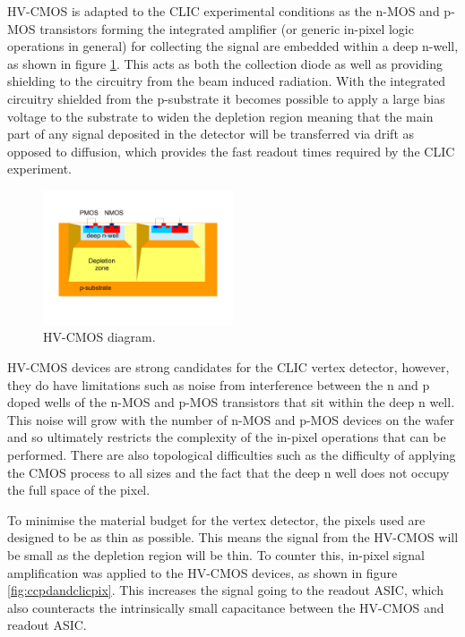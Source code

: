 HV-CMOS is adapted to the CLIC experimental conditions as the n-MOS and p-MOS transistors forming the integrated amplifier (or generic in-pixel logic operations in general) for collecting the signal are embedded within a deep n-well, as shown in figure \ref{fig:hvcmos}.  This acts as both the collection diode as well as providing shielding to the circuitry from the beam induced radiation.  With the integrated circuitry shielded from the p-substrate it becomes possible to apply a large bias voltage to the substrate to widen the depletion region meaning that the main part of any signal deposited in the detector will be transferred via drift as opposed to diffusion, which provides the fast readout times required by the CLIC experiment.  

\begin{figure}
\centering
\includegraphics[width=0.5\textwidth]{CLICdpVertex/Plots/HV-CMOSDiagram.pdf}
\caption[HV-CMOS diagram.]{HV-CMOS diagram.}
\label{fig:hvcmos}
\end{figure}

HV-CMOS devices are strong candidates for the CLIC vertex detector, however, they do have limitations such as noise from interference between the n and p doped wells of the n-MOS and p-MOS transistors that sit within the deep n well.  This noise will grow with the number of n-MOS and p-MOS devices on the wafer and so ultimately restricts the complexity of the in-pixel operations that can be performed.  There are also topological difficulties such as the difficulty of applying the CMOS process to all sizes and the fact that the deep n well does not occupy the full space of the pixel.  

To minimise the material budget for the vertex detector, the pixels used are designed to be as thin as possible.  This means the signal from the HV-CMOS will be small as the depletion region will be thin.  To counter this, in-pixel signal amplification was applied to the HV-CMOS devices, as shown in figure \ref{fig:ccpdandclicpix}.  This increases the signal going to the readout ASIC, which also counteracts the intrinsically small capacitance between the HV-CMOS and readout ASIC.

